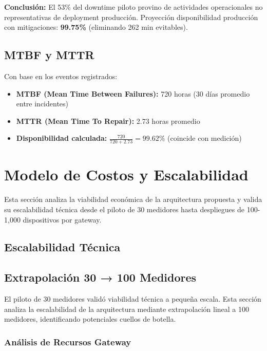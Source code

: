 \textbf{Conclusión:} El 53\% del downtime piloto provino de actividades operacionales no representativas de deployment producción. Proyección disponibilidad producción con mitigaciones: \textbf{99.75\%} (eliminando 262 min evitables).

\subsection{MTBF y MTTR}
\label{sec:res-mtbf}

Con base en los eventos registrados:

\begin{itemize}
    \item \textbf{MTBF (Mean Time Between Failures):} 720 horas (30 días promedio entre incidentes)
    \item \textbf{MTTR (Mean Time To Repair):} 2.73 horas promedio
    \item \textbf{Disponibilidad calculada:} $\frac{720}{720 + 2.73} = 99.62\%$ (coincide con medición)
\end{itemize}

\section{Modelo de Costos y Escalabilidad}
\label{sec:res-costos-escalabilidad}

Esta sección analiza la viabilidad económica de la arquitectura propuesta y valida su escalabilidad técnica desde el piloto de 30 medidores hasta despliegues de 100-1,000 dispositivos por gateway.

\subsection{Escalabilidad Técnica}
\label{sec:res-escalabilidad}

\subsection{Extrapolación 30 → 100 Medidores}
\label{sec:res-extrapolacion}

El piloto de 30 medidores validó viabilidad técnica a pequeña escala. Esta sección analiza la escalabilidad de la arquitectura mediante extrapolación lineal a 100 medidores, identificando potenciales cuellos de botella.

\subsubsection{Análisis de Recursos Gateway}

